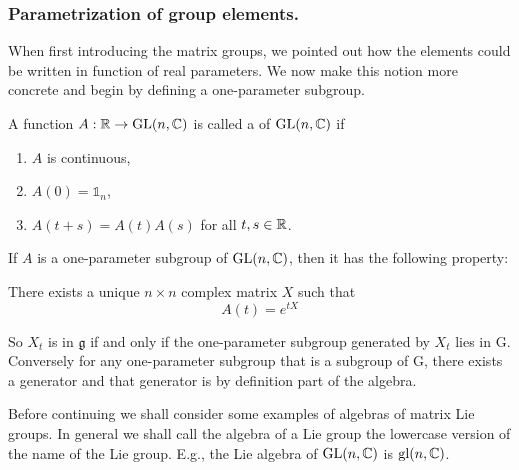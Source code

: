\subsubsection{Parametrization of group elements.}
When first introducing the matrix groups, we pointed out how the elements could be written in function of real parameters. We now make this notion more concrete and begin by defining a one-parameter subgroup.
\begin{definition}
A function $A : \mathbb{R} \to \operatorname{GL}(n, \mathbb{C})$ is called a  of $\operatorname{GL}(n, \mathbb{C})$ if
\begin{enumerate}
\item $A$ is continuous,
\item $A(0) = \mathbb{1}_n$,
\item $A(t+s) = A(t)A(s)$ for all $t,s \in \mathbb{R}$.
\end{enumerate}
\end{definition}
If $A$ is a one-parameter subgroup of $\operatorname{GL}(n,\mathbb{C})$, then it has the following property:
\begin{eigenschap}
There exists a unique $n\times n$ complex matrix $X$ such that
\[ A(t) = e^{tX} \]
\end{eigenschap}

So $X_t$ is in $\mathfrak{g}$ if and only if the one-parameter subgroup generated by $X_t$ lies in G. Conversely for any one-parameter subgroup that is a subgroup of G, there exists a generator and that generator is by definition part of the algebra.

Before continuing we shall consider some examples of algebras of matrix Lie groups. In general we shall call the algebra of a Lie group the lowercase version of the name of the Lie group. E.g., the Lie algebra of $\operatorname{GL}(n, \mathbb{C})$ is $\operatorname{gl}(n,\mathbb{C})$.

